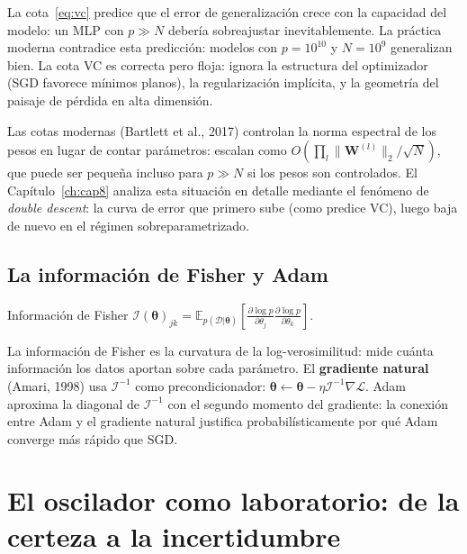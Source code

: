 La cota~\eqref{eq:vc} predice que el error de generalización crece con
la capacidad del modelo: un MLP con $p \gg N$ debería sobreajustar
inevitablemente. La práctica moderna contradice esta predicción: modelos
con $p = 10^{10}$ y $N = 10^9$ generalizan bien. La cota VC es correcta
pero floja: ignora la estructura del optimizador (SGD favorece mínimos
planos), la regularización implícita, y la geometría del paisaje de
pérdida en alta dimensión.

Las cotas modernas (Bartlett et al., 2017) controlan la norma espectral
de los pesos en lugar de contar parámetros: escalan como
$O(\prod_l\|\bm{W}^{(l)}\|_2 / \sqrt{N})$, que puede ser pequeña
incluso para $p \gg N$ si los pesos son controlados. El
Capítulo~\ref{ch:cap8} analiza esta situación en detalle mediante el
fenómeno de \textit{double descent}: la curva de error que primero sube
(como predice VC), luego baja de nuevo en el régimen sobreparametrizado.

\subsection{La información de Fisher y Adam}
\label{subsec:fisher_adam}

\begin{definicion}{Información de Fisher}
\label{def:fisher}
$\mathcal{I}(\bm{\theta})_{jk} = \mathbb{E}_{p(\mathcal{D}|\bm{\theta})}
\!\left[\frac{\partial\log p}{\partial\theta_j}
\frac{\partial\log p}{\partial\theta_k}\right]$.
\end{definicion}

La información de Fisher es la curvatura de la log-verosimilitud: mide
cuánta información los datos aportan sobre cada parámetro. El
\textbf{gradiente natural} (Amari, 1998) usa $\mathcal{I}^{-1}$ como
precondicionador:
$\bm{\theta} \leftarrow \bm{\theta} -
\eta\mathcal{I}^{-1}\nabla\mathcal{L}$. Adam aproxima la diagonal de
$\mathcal{I}^{-1}$ con el segundo momento del gradiente: la conexión
entre Adam y el gradiente natural justifica probabilísticamente por qué
Adam converge más rápido que SGD.

\section{El oscilador como laboratorio: de la certeza a la incertidumbre}
\label{sec:oscilador7}

